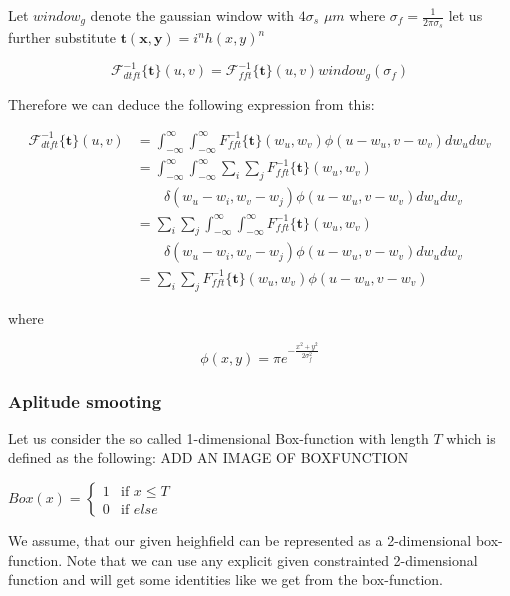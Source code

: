Let $window_g$ denote the gaussian window with $4\sigma_s$ $\mu m$ where $\sigma_f = \frac{1}{2\pi\sigma_s}$
let us further substitute $\mathbf{t(x,y)}=i^n h(x,y)^n$

\begin{equation}
\mathcal{F}_{dtft}^{-1}\{\mathbf{t}\}(u,v) = \mathcal{F}_{fft}^{-1}\{\mathbf{t}\}(u,v)window_g(\sigma_f)
\end{equation} 

Therefore we can deduce the following expression from this:

\begin{align*}
\mathcal{F}_{dtft}^{-1}\{\mathbf{t}\}(u,v)
& = \int_{-\infty}^{\infty} \int_{-\infty}^{\infty} {F}_{fft}^{-1}\{\mathbf{t}\}(w_u,w_v) \phi(u-w_u, v-w_v) dw_u dw_v \\
& = \int_{-\infty}^{\infty} \int_{-\infty}^{\infty} \sum_i \sum_j {F}_{fft}^{-1}\{\mathbf{t}\}(w_u,w_v) \\ 
& \quad \quad \delta(w_u-w_i, w_v-w_j)\phi(u-w_u, v-w_v) dw_u dw_v \\
& = \sum_i \sum_j \int_{-\infty}^{\infty} \int_{-\infty}^{\infty}  {F}_{fft}^{-1}\{\mathbf{t}\}(w_u,w_v) \\
& \quad \quad \delta(w_u-w_i, w_v-w_j)\phi(u-w_u, v-w_v) dw_u dw_v \\
& = \sum_i \sum_j {F}_{fft}^{-1}\{\mathbf{t}\}(w_u,w_v) \phi(u-w_u, v-w_v)
\end{align*}

where 

\begin{equation} \label{eq:gaussweight}
 \phi(x,y) = \pi e^{-\frac{x^2 + y^2}{2\sigma_{f}^2}}
\end{equation} 

\subsubsection{Aplitude smooting}
Let us consider the so called 1-dimensional Box-function with length $T$ which is defined as the following: 
ADD AN IMAGE OF BOXFUNCTION

$
Box(x) =
\left\{
	\begin{array}{ll}
		1  & \mbox{if } x \leq T \\
		0 & \mbox{if } else
	\end{array}
\right.
$

We assume, that our given heighfield can be represented as a 2-dimensional box-function. 
Note that we can use any explicit given constrainted 2-dimensional function and will get some identities like
we get from the box-function.
 
